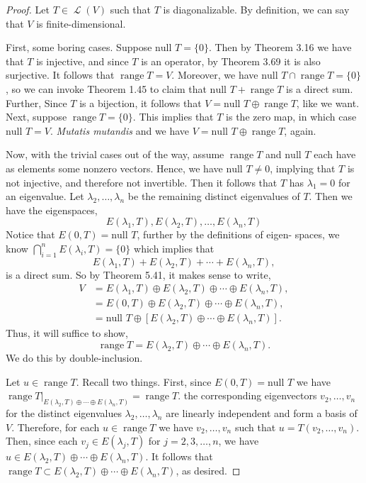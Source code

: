 \documentclass[letterpaper, 12pt]{amsart}
\DeclareMathOperator{\Ell}{\mathscr{L}}				%
\renewcommand{\null}{\text{null }}					%
\DeclareMathOperator{\range}{\text{range }}			%
\theoremstyle{definition}  							%
\begin{document}
		\begin{proof}
		Let $T \in \Ell(V)$ such that $T$ is diagonalizable.
		By definition, we can say that $V$ is finite-dimensional.

		First, some boring cases.
		Suppose $\null T = \{ 0 \}$.
		Then by Theorem 3.16 we have that $T$ is injective, and since $T$ is an operator, by Theorem 3.69 it is also surjective.
		It follows that $\range T = V$.
		Moreover, we have $\null T \cap \range T = \{ 0 \}$, so we can invoke Theorem 1.45 to claim that $\null T + \range T$ is a direct sum.
		Further, Since $T$ is a bijection, it follows that $V = \null T \oplus \range T$, like we want.
		Next, suppose $\range T = \{ 0 \}$.
		This implies that $T$ is the zero map, in which case $\null T = V$.
		\textit{Mutatis mutandis} and we have $V = \null T \oplus \range T$, again.

		Now, with the trivial cases out of the way, assume $\range T$ and $\null T$ each have as elements some nonzero vectors.
		Hence, we have $\null T \neq 0$, implying that $T$ is not injective, and therefore not invertible.
		Then it follows that $T$ has $\lambda_{1} = 0$ for an eigenvalue.
		Let $\lambda_{2}, \dots, \lambda_{n}$ be the remaining distinct eigenvalues of $T$.
		Then we have the eigenspaces, $$E(\lambda_{1}, T), E(\lambda_{2},T), \dots, E(\lambda_{n}, T)$$
		Notice that $E(0,T) = \null T$, further by the definitions of eigen-
		spaces, we know $\bigcap_{i=1}^{n} E(\lambda_{i},T) = \{ 0 \}$ which implies that $$E(\lambda_{1}, T) + E(\lambda_{2},T) + \cdots + E(\lambda_{n}, T),$$ is a direct sum.
		So by Theorem 5.41, it makes sense to write,
			\begin{align*}
				V &= E(\lambda_{1}, T) \oplus E(\lambda_{2},T) \oplus \cdots \oplus E(\lambda_{n}, T), \\
				&= E(0, T) \oplus E(\lambda_{2},T) \oplus \cdots \oplus E(\lambda_{n}, T), \\
				&= \null T \oplus \left[ E(\lambda_{2},T) \oplus \cdots \oplus E(\lambda_{n}, T) \right].
			\end{align*}
		Thus, it will suffice to show, $$\range T = E(\lambda_{2},T) \oplus \cdots \oplus E(\lambda_{n}, T).$$
		We do this by double-inclusion.

		Let $u \in \range T$.
		Recall two things.
		First, since $E(0,T) = \null T$ we have $\range T|_{E(\lambda_{2},T) \oplus \cdots \oplus E(\lambda_{n}, T)} = \range T$.
		 the corresponding eigenvectors $v_{2}, \dots, v_{n}$ for the distinct eigenvalues $\lambda_{2}, \dots, \lambda_{n}$ are linearly independent and form a basis of $V$.
		Therefore, for each $u \in \range T$ we have $v_{2}, \dots, v_{n}$ such that $u = T(v_{2}, \dots, v_{n})$.
		Then, since each $v_{j} \in E(\lambda_{j},T)$ for $j = 2,3,\dots,n$, we have $u \in E(\lambda_{2},T) \oplus \cdots \oplus E(\lambda_{n}, T)$.
		It follows that $\range T \subset E(\lambda_{2},T) \oplus \cdots \oplus E(\lambda_{n}, T)$, as desired.


\end{proof}
\end{document}
